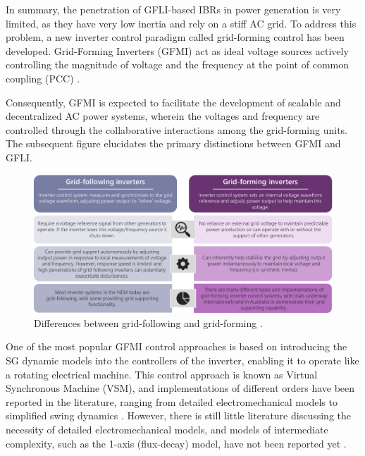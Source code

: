 In summary, the penetration of GFLI-based IBRs in power generation is very
limited, as they have very low inertia and rely on a stiff AC grid. To address
this problem, a new inverter control paradigm called grid-forming control has
been developed. Grid-Forming Inverters (GFMI) act as ideal voltage sources
actively controlling the magnitude of voltage and the frequency at the point of
common coupling (PCC) \cite{pattabiraman2018comparison}.

Consequently, GFMI is expected to facilitate the development of scalable and
decentralized AC power systems, wherein the voltages and frequency are
controlled through the collaborative interactions among the grid-forming units.
The subsequent figure elucidates the primary distinctions between GFMI and GFLI.

\begin{figure}[h!]
    \centering
    \includegraphics[width=14cm]{images/gfli_vs_gfmi.png}
    \caption{Differences between grid-following and grid-forming
    \cite{taylor2021application}.}
    \label{fig:gfli_vs_gfmi}
\end{figure}

One of the most popular GFMI control approaches is based on introducing the SG
dynamic models into the controllers of the inverter, enabling it to operate like
a rotating electrical machine. This control approach is known as Virtual
Synchronous Machine (VSM), and implementations of different orders have been
reported in the literature, ranging from detailed electromechanical models
\cite{beck2007vsm}\cite{zhang2013vsm} to simplified swing dynamics
\cite{zhong2011synchronverter}\cite{alipoor2015power}. However, there is still
little literature discussing the necessity of detailed electromechanical models,
and models of intermediate complexity, such as the 1-axis (flux-decay) model,
have not been reported yet \cite{chen2020modeling}.

